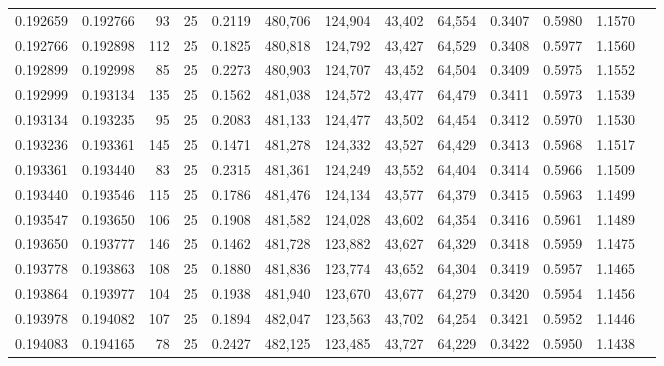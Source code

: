 \begin{tabular}{rrrrrrrrrrrrr}
0.192659 & 0.192766 &    93 &  25 &                                     0.2119 & 480,706 & 124,904 &  43,402 &  64,554 & 0.3407 & 0.5980 & 1.1570 \\
0.192766 & 0.192898 &   112 &  25 &                                     0.1825 & 480,818 & 124,792 &  43,427 &  64,529 & 0.3408 & 0.5977 & 1.1560 \\
0.192899 & 0.192998 &    85 &  25 &                                     0.2273 & 480,903 & 124,707 &  43,452 &  64,504 & 0.3409 & 0.5975 & 1.1552 \\
0.192999 & 0.193134 &   135 &  25 &                                     0.1562 & 481,038 & 124,572 &  43,477 &  64,479 & 0.3411 & 0.5973 & 1.1539 \\
0.193134 & 0.193235 &    95 &  25 &                                     0.2083 & 481,133 & 124,477 &  43,502 &  64,454 & 0.3412 & 0.5970 & 1.1530 \\
0.193236 & 0.193361 &   145 &  25 &                                     0.1471 & 481,278 & 124,332 &  43,527 &  64,429 & 0.3413 & 0.5968 & 1.1517 \\
0.193361 & 0.193440 &    83 &  25 &                                     0.2315 & 481,361 & 124,249 &  43,552 &  64,404 & 0.3414 & 0.5966 & 1.1509 \\
0.193440 & 0.193546 &   115 &  25 &                                     0.1786 & 481,476 & 124,134 &  43,577 &  64,379 & 0.3415 & 0.5963 & 1.1499 \\
0.193547 & 0.193650 &   106 &  25 &                                     0.1908 & 481,582 & 124,028 &  43,602 &  64,354 & 0.3416 & 0.5961 & 1.1489 \\
0.193650 & 0.193777 &   146 &  25 &                                     0.1462 & 481,728 & 123,882 &  43,627 &  64,329 & 0.3418 & 0.5959 & 1.1475 \\
0.193778 & 0.193863 &   108 &  25 &                                     0.1880 & 481,836 & 123,774 &  43,652 &  64,304 & 0.3419 & 0.5957 & 1.1465 \\
0.193864 & 0.193977 &   104 &  25 &                                     0.1938 & 481,940 & 123,670 &  43,677 &  64,279 & 0.3420 & 0.5954 & 1.1456 \\
0.193978 & 0.194082 &   107 &  25 &                                     0.1894 & 482,047 & 123,563 &  43,702 &  64,254 & 0.3421 & 0.5952 & 1.1446 \\
0.194083 & 0.194165 &    78 &  25 &                                     0.2427 & 482,125 & 123,485 &  43,727 &  64,229 & 0.3422 & 0.5950 & 1.1438 \\

\end{tabular}
